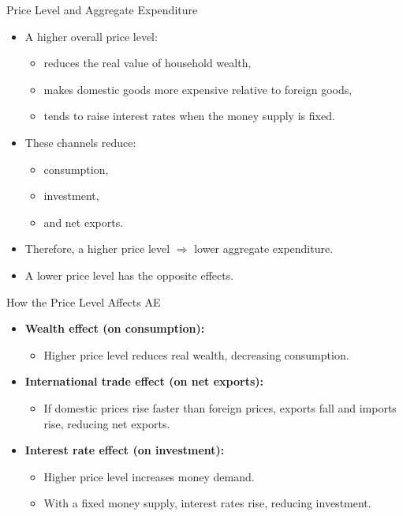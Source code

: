 \documentclass[aspectratio=169]{beamer}
\begin{document}
\begin{frame}{Price Level and Aggregate Expenditure}
\transfade
\begin{itemize}
  \item A higher overall price level:
  \begin{itemize}
    \item reduces the real value of household wealth,
    \item makes domestic goods more expensive relative to foreign goods,
    \item tends to raise interest rates when the money supply is fixed.
  \end{itemize}
  \item These channels reduce:
  \begin{itemize}
    \item consumption,
    \item investment,
    \item and net exports.
  \end{itemize}
  \item Therefore, a higher price level \(\Rightarrow\) lower aggregate expenditure.
  \item A lower price level has the opposite effects.
\end{itemize}
\end{frame}

\begin{frame}{How the Price Level Affects AE}
\transfade
\begin{itemize}
  \item \textbf{Wealth effect (on consumption):}
  \begin{itemize}
    \item Higher price level reduces real wealth, decreasing consumption.
  \end{itemize}
  \item \textbf{International trade effect (on net exports):}
  \begin{itemize}
    \item If domestic prices rise faster than foreign prices, exports fall and imports rise, reducing net exports.
  \end{itemize}
  \item \textbf{Interest rate effect (on investment):}
  \begin{itemize}
    \item Higher price level increases money demand.
    \item With a fixed money supply, interest rates rise, reducing investment.
  \end{itemize}
\end{itemize}
\end{frame}
\end{document}
